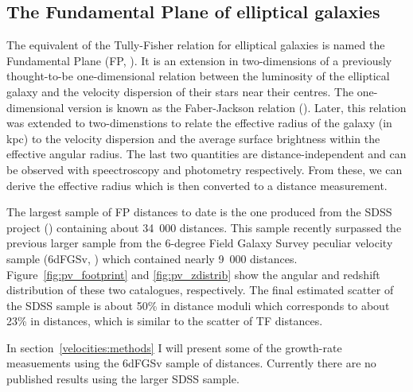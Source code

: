     \subsection{The Fundamental Plane of elliptical galaxies} 
    \label{velocities:measuring:fp}
    
    The equivalent of the Tully-Fisher relation for elliptical galaxies is 
    named the Fundamental Plane (FP, \cite{djorgovskiFundamentalPropertiesElliptical1987}). 
    It is an extension in two-dimensions of a previously thought-to-be one-dimensional 
    relation between the luminosity of the elliptical galaxy and 
    the velocity dispersion of their stars near their centres. The one-dimensional version is 
    known as the Faber-Jackson relation (\cite{faberVelocityDispersionsMasstolight1976}). 
    Later, this relation was extended to two-dimenstions to relate the effective radius of the galaxy 
    (in kpc) to the velocity dispersion and the average surface brightness within the effective angular radius. 
    The last two quantities are distance-independent and can be observed with speectroscopy and photometry 
    respectively. From these, we can derive the effective radius which is then converted to a distance measurement. 

    The largest sample of FP distances to date is the one produced from the SDSS project 
    (\cite{howlettSloanDigitalSky2022a}) containing about 34~000 distances. 
    This sample recently surpassed the previous larger sample from the 6-degree Field Galaxy Survey 
    peculiar velocity sample (6dFGSv, \cite{springob6dFGalaxySurvey2014}) which contained nearly 9~000 distances. 
    Figure~\ref{fig:pv_footprint} and \ref{fig:pv_zdistrib} show the angular and redshift distribution 
    of these two catalogues, respectively. 
    The final estimated scatter of the SDSS sample is about 50\% in distance moduli 
    which corresponds to about 23\% in distances, which is similar to the scatter of 
    TF distances. 

    In section~\ref{velocities:methods} I will present some of the growth-rate measuements 
    using the 6dFGSv sample of distances. Currently there are no published results using 
    the larger SDSS sample. 

